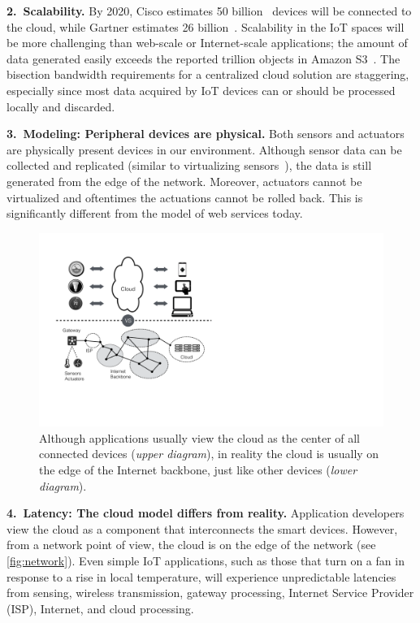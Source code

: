 \noindent\textbf{2.~Scalability.} By 2020, Cisco estimates 50
billion~\cite{evans2011internet} devices will be connected to the cloud,
while Gartner estimates 26 billion~\cite{middleton2013forecast}. Scalability in
the IoT spaces will be more challenging than web-scale or Internet-scale
applications; the amount of data generated easily exceeds the reported trillion
objects in Amazon S3~\cite{barr2013amazon}. The bisection bandwidth requirements
for a centralized cloud solution are staggering, especially since most
data acquired by IoT devices can or should be processed locally and discarded.

\noindent\textbf{3.~Modeling: Peripheral devices are physical.}  Both sensors
and actuators are physically present devices in our environment.  Although
sensor data can be collected and replicated (similar to virtualizing
sensors~\cite{yuriyama2010sensor}), the data is still generated from the edge of
the network.  Moreover, actuators cannot be virtualized and oftentimes the
actuations cannot be rolled back.  This is significantly different from the
model of web services today.

\begin{figure}
  \centering
  \includegraphics[width=0.8\columnwidth]{figures/cloud-view.pdf}
  \caption{Although applications usually view the cloud as the center of
    all connected devices (\textit{upper diagram}), in reality the cloud
    is usually on the edge of the Internet backbone, just like other
    devices (\textit{lower diagram}).}
  \label{fig:network}
\end{figure}

\noindent\textbf{4.~Latency: The cloud model differs from reality.}  Application
developers view the cloud as a component that interconnects the smart
devices.  However, from a network point of view, the cloud is on
the edge of the network (see \autoref{fig:network}).  Even
simple IoT applications, such as those that turn on a fan in response to a
rise in local temperature, will experience unpredictable latencies from
sensing, wireless transmission, gateway processing, Internet Service Provider
(ISP), Internet, and cloud processing.

